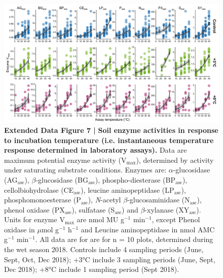 \documentclass[
  letterpaper,
  DIV=11,
  numbers=noendperiod]{scrartcl}
\begin{document}
\begin{figure}

{\centering \includegraphics[width=1\textwidth,height=\textheight]{FIGURES/Extended_Data_Fig_7.png}

}

\caption{\textbf{Extended Data Figure 7 |}
\textbf{Soil enzyme activities in response to incubation temperature (i.e. instantaneous temperature response determined in laboratory assays).}
Data are maximum potential enzyme activity (V\(_{\mathrm{max}}\)),
determined by activity under saturating substrate conditions. Enzymes
are: \(\alpha\)-glucosidase (AG\(_{\mathrm{ase}}\)),
\(\beta\)-glucosidase (BG\(_{\mathrm{ase}}\)), phospho-diesterase
(BP\(_{\mathrm{ase}}\)), cellolbiohydrolase (CE\(_{\mathrm{ase}}\)),
leucine aminopeptidase (LP\(_{\mathrm{ase}}\)), phosphomonoesterase
(P\(_{\mathrm{ase}}\)), \textsl{N}-acetyl \(\beta\)-glucosaminidase
(N\(_{\mathrm{ase}}\)), phenol oxidase (PX\(_{\mathrm{ase}}\)),
sulfatase (S\(_{\mathrm{ase}}\)) and \(\beta\)-xylanase
(XY\(_{\mathrm{ase}}\)). Units for enzyme V\(_{\mathrm{max}}\) are nmol
MU g\(^{-1}\) min\(^{-1}\), except Phenol oxidase in \(\mu\)mol
g\(^{-1}\) h\(^{-1}\) and Leucine aminopeptidase in nmol AMC g\(^{-1}\)
min\(^{-1}\). All data are for are for n = 10 plots, determined during
the wet season 2018. Controls include 4 sampling periods (June, Sept,
Oct, Dec 2018); +3°C include 3 sampling periods (June, Sept, Dec 2018);
+8°C include 1 sampling period (Sept 2018).}

\end{figure}
\end{document}

